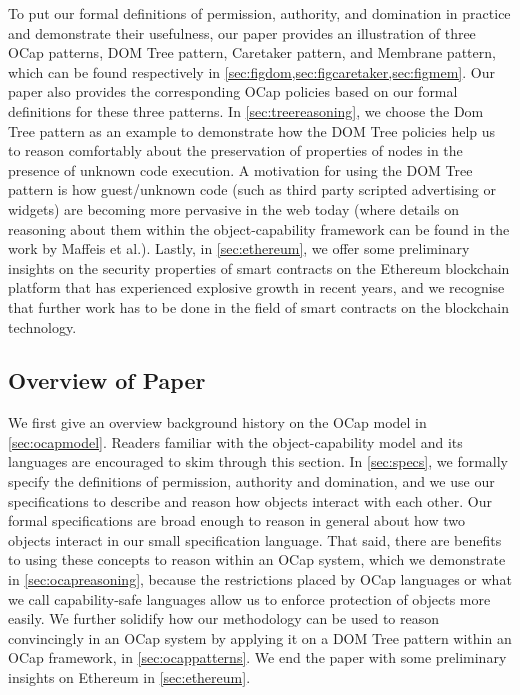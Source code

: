 \documentclass[a4paper,11pt,twoside]{article}
\begin{document}
To put our formal definitions of permission, authority, and domination in practice and demonstrate their usefulness, 
our paper provides an illustration of three OCap patterns, DOM Tree pattern, Caretaker pattern, and Membrane pattern, which can be found respectively in \cref{sec:figdom,sec:figcaretaker,sec:figmem}. Our paper also provides the corresponding OCap policies based on our formal definitions for these three patterns. In \cref{sec:treereasoning}, we choose the Dom Tree pattern as an example to demonstrate how the DOM Tree policies help us to reason comfortably about the preservation of properties of nodes in the presence of unknown code execution. A motivation for using the DOM Tree pattern is how guest/unknown code (such as third party scripted advertising or widgets) are becoming more pervasive in the web today (where details on reasoning about them within the object-capability framework can be found in the work by Maffeis et al.\cite{maffeis2010}). Lastly, in \cref{sec:ethereum}, we offer some preliminary insights on the security properties of smart contracts on the Ethereum blockchain platform that has experienced explosive growth in recent years, and we recognise that further work has to be done in the field of smart contracts on the blockchain technology.

\subsection{Overview of Paper}
We first give an overview background history on the OCap model in \cref{sec:ocapmodel}. Readers familiar with the object-capability model and its languages are encouraged to skim through this section. In \cref{sec:specs}, we formally specify the definitions of permission, authority and domination, and we use our specifications to describe and reason how objects interact with each other. Our formal specifications are broad enough to reason in general about how two objects interact in our small specification language. That said, there are benefits to using these concepts to reason within an OCap system, which we demonstrate in \cref{sec:ocapreasoning}, because the restrictions placed by OCap languages or what we call capability-safe languages allow us to enforce protection of objects more easily. We further solidify how our methodology can be used to reason convincingly in an OCap system by applying it on a DOM Tree pattern within an OCap framework, in \cref{sec:ocappatterns}. We end the paper with some preliminary insights on Ethereum in \cref{sec:ethereum}.
\end{document}
